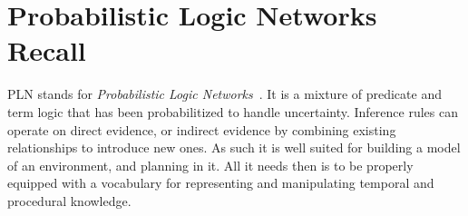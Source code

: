 \documentclass[runningheads]{llncs}
\begin{document}




\section{Probabilistic Logic Networks Recall}
\label{sec:recall}
PLN stands for \emph{Probabilistic Logic
  Networks}~\cite{Goertzel09PLN}.  It is a mixture of predicate and
term logic that has been probabilitized to handle uncertainty.
Inference rules can operate on direct evidence, or indirect evidence
by combining existing relationships to introduce new ones.
As such it is well suited for building a model of an environment, and
planning in it.  All it needs then is to be properly equipped with a
vocabulary for representing and manipulating temporal and procedural
knowledge.
\end{document}
